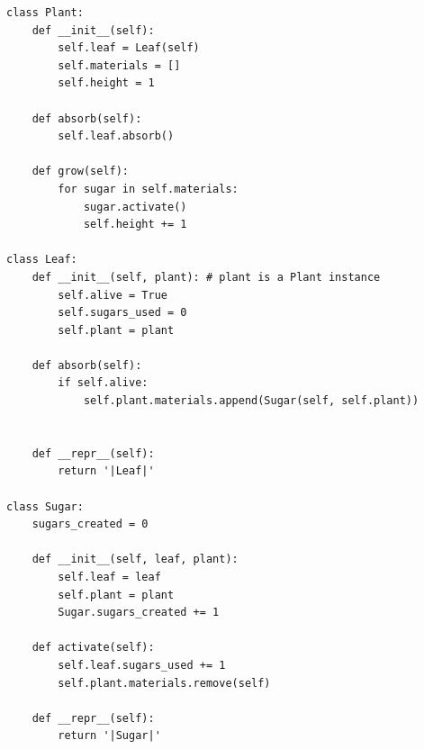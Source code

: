 \begin{solution}
\begin{lstlisting}
class Plant:
    def __init__(self):
        self.leaf = Leaf(self)
        self.materials = []
        self.height = 1

    def absorb(self):
        self.leaf.absorb()

    def grow(self):
        for sugar in self.materials:
            sugar.activate()
            self.height += 1

class Leaf:
    def __init__(self, plant): # plant is a Plant instance
        self.alive = True
        self.sugars_used = 0
        self.plant = plant

    def absorb(self):
        if self.alive:
            self.plant.materials.append(Sugar(self, self.plant))


    def __repr__(self):
        return '|Leaf|'

class Sugar:
    sugars_created = 0

    def __init__(self, leaf, plant):
        self.leaf = leaf
        self.plant = plant
        Sugar.sugars_created += 1

    def activate(self):
        self.leaf.sugars_used += 1
        self.plant.materials.remove(self)

    def __repr__(self):
        return '|Sugar|'
\end{lstlisting}
\end{solution}
